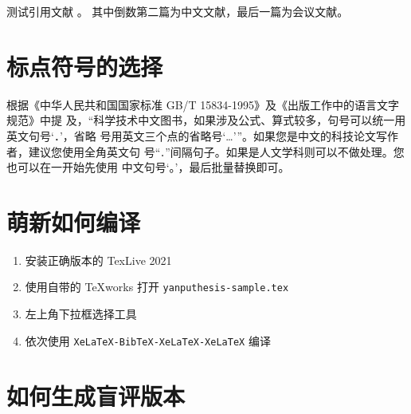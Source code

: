 \documentclass[lang=chs, degree=phd, blindreview=false, winfonts=true, academic=true]{yanputhesis}
\begin{document}
测试引用文献 \cite{szegedy2015going, shen2021peridynamic, chen2014maiyuan, chen2018autonomous}。
其中倒数第二篇为中文文献，最后一篇为会议文献。

\section{标点符号的选择}

根据《中华人民共和国国家标准 GB/T 15834-1995》及《出版工作中的语言文字规范》中提
及，“科学技术中文图书，如果涉及公式、算式较多，句号可以统一用英文句号‘．’，省略
号用英文三个点的省略号‘…’”。如果您是中文的科技论文写作者，建议您使用全角英文句
号“\lstinline`．`”间隔句子。如果是人文学科则可以不做处理。您也可以在一开始先使用
中文句号‘。’，最后批量替换即可。

\section{萌新如何编译}

\begin{enumerate}
    \setlength{\itemsep}{0pt}
    \item 安装正确版本的 TexLive 2021
    \item 使用自带的 TeXworks 打开 \lstinline`yanputhesis-sample.tex`
    \item 左上角下拉框选择工具
    \item 依次使用 \lstinline`XeLaTeX-BibTeX-XeLaTeX-XeLaTeX` 编译
\end{enumerate}

\section{如何生成盲评版本}
\end{document}
